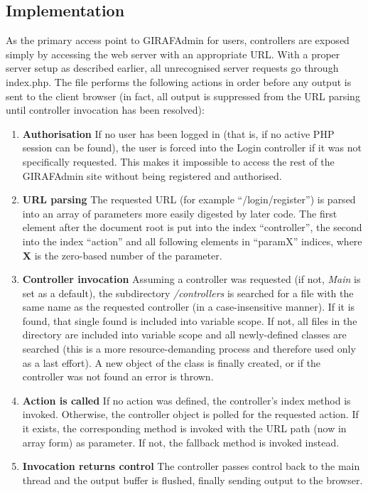 \subsection{Implementation}
As the primary access point to GIRAFAdmin for users, controllers are exposed simply by accessing the web server with an appropriate URL. With a proper server setup as described earlier, all unrecognised server requests go through index.php. The file performs the following actions in order before any output is sent to the client browser (in fact, all output is suppressed from the URL parsing until controller invocation has been resolved):
\begin{enumerate}
    \item \textbf{Authorisation} If no user has been logged in (that is, if no active PHP session can be found), the user is forced into the Login controller if it was not specifically requested. This makes it impossible to access the rest of the GIRAFAdmin site without being registered and authorised.
    \item \textbf{URL parsing} The requested URL (for example ``/login/register'') is parsed into an array of parameters more easily digested by later code. The first element after the document root is put into the index ``controller'', the second into the index ``action'' and all following elements in ``paramX'' indices, where \textbf{X} is the zero-based number of the parameter.
    \item \textbf{Controller invocation} Assuming a controller was requested (if not, \emph{Main} is set as a default), the subdirectory \emph{/controllers} is searched for a file with the same name as the requested controller (in a case-insensitive manner). If it is found, that single found is included into variable scope. If not, all files in the directory are included into variable scope and all newly-defined classes are searched (this is a more resource-demanding process and therefore used only as a last effort). A new object of the class is finally created, or if the controller was not found an error is thrown.
    \item \textbf{Action is called} If no action was defined, the controller's index method is invoked. Otherwise, the controller object is polled for the requested action. If it exists, the corresponding method is invoked with the URL path (now in array form) as parameter. If not, the fallback method is invoked instead.
    \item \textbf{Invocation returns control} The controller passes control back to the main thread and the output buffer is flushed, finally sending output to the browser.
\end{enumerate}

